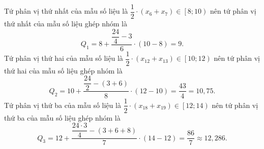 \begin{bt}
{\begin{enumerate}[a)]
			Tứ phân vị thứ nhất của mẫu số liệu là $ \dfrac{1}{2}\cdot\left( x_6+x_7\right) \in \left[8 ; 10 \right)$ nên tứ phân vị thứ nhất của mẫu số liệu ghép nhóm là $$Q_1= 8+\dfrac{\dfrac{24}{4}-3}{6} \cdot \left( 10-8\right)=9.$$
			Tứ phân vị thứ hai của mẫu số liệu là $ \dfrac{1}{2}\cdot\left( x_{12}+x_{13}\right) \in \left[10 ; 12 \right)$ nên tứ phân vị thứ hai của mẫu số liệu ghép nhóm là $$Q_2= 10+\dfrac{\dfrac{24}{2}-(3+6)}{8} \cdot \left( 12-10\right)=\dfrac{43}{4}=10{,}75.$$
			Tứ phân vị thứ ba của mẫu số liệu là $\dfrac{1}{2}\cdot\left(  x_{18}+x_{19}\right)\in \left[ 12 ; 14\right)$ nên tứ phân vị thứ ba của mẫu số liệu ghép nhóm là $$Q_3= 12+\dfrac{\dfrac{24\cdot 3}{4}-(3+6+8)}{7} \cdot \left( 14-12\right)=\dfrac{86}{7}\approx 12{,}286.$$
		\end{enumerate}
	}
\end{bt}


